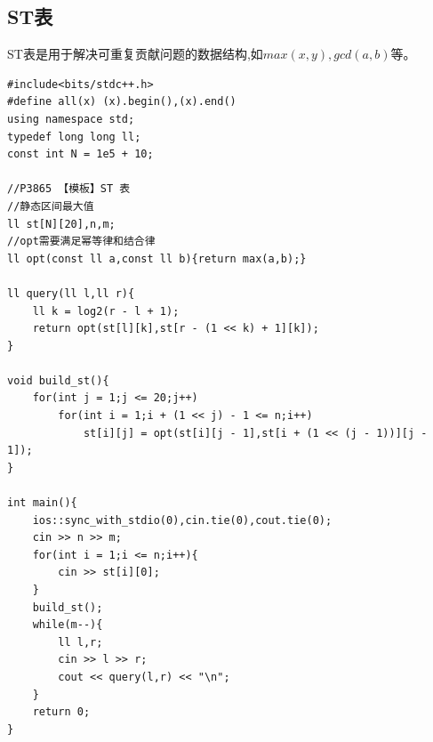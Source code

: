 \documentclass[10pt,a4paper]{article}
\begin{document}
\subsection{ST表}
ST表是用于解决可重复贡献问题的数据结构,如$max(x,y),gcd(a,b)$等。
\begin{lstlisting}[caption={}]
#include<bits/stdc++.h>
#define all(x) (x).begin(),(x).end()
using namespace std;
typedef long long ll;
const int N = 1e5 + 10;

//P3865 【模板】ST 表
//静态区间最大值
ll st[N][20],n,m; 
//opt需要满足幂等律和结合律
ll opt(const ll a,const ll b){return max(a,b);}

ll query(ll l,ll r){
    ll k = log2(r - l + 1); 
    return opt(st[l][k],st[r - (1 << k) + 1][k]); 
}

void build_st(){
	for(int j = 1;j <= 20;j++)
        for(int i = 1;i + (1 << j) - 1 <= n;i++)
            st[i][j] = opt(st[i][j - 1],st[i + (1 << (j - 1))][j - 1]);
}

int main(){
	ios::sync_with_stdio(0),cin.tie(0),cout.tie(0);
	cin >> n >> m;
	for(int i = 1;i <= n;i++){
		cin >> st[i][0];
	}
	build_st();
	while(m--){
		ll l,r;
		cin >> l >> r;
		cout << query(l,r) << "\n";
	}
	return 0;
}
\end{lstlisting}
\end{document}

